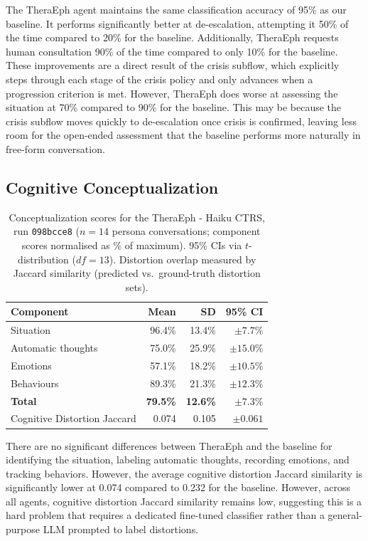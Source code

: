 \documentclass[twoside]{report}
\begin{document}
The TheraEph agent maintains the same classification accuracy of 95\% as our baseline. It performs significantly better at de-escalation, attempting it 50\% of the time compared to 20\% for the baseline. Additionally, TheraEph requests human consultation 90\% of the time compared to only 10\% for the baseline. These improvements are a direct result of the crisis subflow, which explicitly steps through each stage of the crisis policy and only advances when a progression criterion is met. However, TheraEph does worse at assessing the situation at 70\% compared to 90\% for the baseline. This may be because the crisis subflow moves quickly to de-escalation once crisis is confirmed, leaving less room for the open-ended assessment that the baseline performs more naturally in free-form conversation.

\subsection{Cognitive Conceptualization}

\begin{table}[ht]
\centering
\caption{Conceptualization scores for the TheraEph - Haiku CTRS, run \texttt{098bcce8} ($n = 14$ persona conversations; component scores normalised as \% of maximum). 95\% CIs via $t$-distribution ($df = 13$). Distortion overlap measured by Jaccard similarity (predicted vs.\ ground-truth distortion sets).}
\label{tab:concept_098bcce8}
\begin{tabular}{|l|r|r|r|}
\hline
\textbf{Component} & \textbf{Mean} & \textbf{SD} & \textbf{95\% CI} \\
\hline
\hline
Situation & 96.4\% & 13.4\% & $\pm 7.7\%$ \\
\hline
Automatic thoughts & 75.0\% & 25.9\% & $\pm 15.0\%$ \\
\hline
Emotions & 57.1\% & 18.2\% & $\pm 10.5\%$ \\
\hline
Behaviours & 89.3\% & 21.3\% & $\pm 12.3\%$ \\
\hline
\hline
\textbf{Total} & \textbf{79.5\%} & \textbf{12.6\%} & $\mathbf{\pm 7.3\%}$ \\
\hline
\hline
Cognitive Distortion Jaccard & 0.074 & 0.105 & $\pm 0.061$ \\
\hline
\end{tabular}
\end{table}
\FloatBarrier

There are no significant differences between TheraEph and the baseline for identifying the situation, labeling automatic thoughts, recording emotions, and tracking behaviors. However, the average cognitive distortion Jaccard similarity is significantly lower at 0.074 compared to 0.232 for the baseline. However, across all agents, cognitive distortion Jaccard similarity remains low, suggesting this is a hard problem that requires a dedicated fine-tuned classifier rather than a general-purpose LLM prompted to label distortions.
\end{document}

